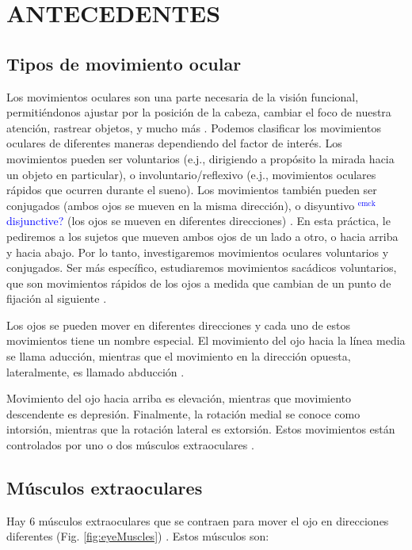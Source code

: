 \documentclass[12pt]{article}
\newcommand{\emck}[1]{\textcolor{blue}{$^{\textrm{emck}}${#1}}}
\begin{document}
\section*{ANTECEDENTES}

\subsection*{Tipos de movimiento ocular}
Los movimientos oculares son una parte necesaria de la visión
funcional, permitiéndonos ajustar por la posición de la cabeza,
cambiar el foco de nuestra atención, rastrear objetos,
y mucho más \cite{foulsham2015eye,schor2011neural}. Podemos clasificar
los movimientos oculares de diferentes maneras dependiendo del factor
de interés. Los movimientos pueden ser voluntarios (e.j., dirigiendo a
propósito la mirada hacia un objeto en particular), o
involuntario/reflexivo (e.j., movimientos oculares rápidos que ocurren
durante el sueno). Los movimientos también pueden ser conjugados
(ambos ojos se mueven en la misma dirección), o disyuntivo
\emck{disjunctive?} (los ojos se mueven en diferentes direcciones)
\cite{mather2016foundations}. En esta práctica, le pediremos a los
sujetos que mueven ambos ojos de un lado a otro, o hacia arriba y
hacia abajo. Por lo tanto, investigaremos movimientos oculares
voluntarios y conjugados. Ser más específico, estudiaremos movimientos
sacádicos voluntarios, que son movimientos rápidos de los ojos a
medida que cambian de un punto de fijación al siguiente
\cite{mather2016foundations}.

Los ojos se pueden mover en diferentes direcciones y cada uno de estos
movimientos tiene un nombre especial. El movimiento del ojo hacia la
línea media se llama aducción, mientras que el movimiento en la
dirección opuesta, lateralmente, es llamado abducción
\cite{purves2001editors}.

Movimiento del ojo hacia arriba es elevación, mientras que movimiento
descendente es depresión. Finalmente, la rotación medial se conoce
como intorsión, mientras que la rotación lateral es extorsión. Estos
movimientos están controlados por uno o dos músculos extraoculares
\cite{purves2001editors}.

\subsection*{Músculos extraoculares}

Hay 6 músculos extraoculares que se contraen para mover el ojo en
direcciones diferentes (Fig. \ref{fig:eyeMuscles})
\cite{openStax2017sensory}. Estos músculos son:
\end{document}

